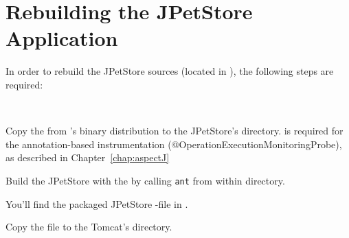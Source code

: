 \begin{figure}[h]\centering
\hfill
{}
\hfill
{}
\hfill
\caption{}
\end{figure}

\newpage

\section{Rebuilding the JPetStore Application}\label{sec:Appendix:JPetStoreExample:rebuild}

\noindent In order to rebuild the JPetStore sources (located in ), 
the following steps are required:

\

\begin{compactenum}
\item Copy the \mainJar{} from \Kieker{}'s
   binary distribution to the JPetStore's  directory. %
   \mainJar{} is required for the annotation-based instrumentation %
   (@OperationExecutionMonitoringProbe), as described in Chapter~\ref{chap:aspectJ}
\item Build the JPetStore with the  by calling \texttt{ant} from %
    within  directory. 
\item You'll find the packaged JPetStore -file in .
\item Copy the file to the Tomcat's  directory.
\end{compactenum}

